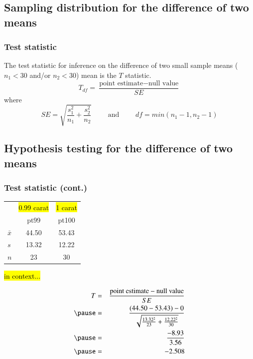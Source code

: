 
\subsection{Sampling distribution for the difference of two means}


\begin{frame}
\frametitle{Test statistic}

{The test statistic for inference on the difference of two small sample means ($n_1 < 30$ and/or $n_2 < 30$) mean is the $T$ statistic.
\[ T_{df} = \frac{\text{point estimate} - \text{null value}}{SE} \]
where 
\[ SE = \sqrt{ \frac{s_1^2}{n_1} + \frac{s_2^2}{n_2} } \qquad \text{ and } \qquad df = min(n_1 - 1, n_2 - 1) \]
}


\end{frame}


\subsection{Hypothesis testing for the difference of two means}


\begin{frame}
\frametitle{Test statistic (cont.)}

{\small
\begin{center}
\begin{tabular}{l | c | c}
		& {\footnotesize \hl{0.99 carat}} &  {\footnotesize \hl{1 carat}}  \\
		& pt99	& pt100 \\
\hline
$\bar{x}$	& 44.50		& 53.43 \\
$s$		& 13.32		& 12.22 \\
$n$		& 23			& 30
\end{tabular}
\end{center}
}

\hl{in context...}

\pause

{\small
\begin{eqnarray*}
T &=& \frac{\text{point estimate} - \text{null value} }{SE} \\
\pause
&=& \frac{(44.50 - 53.43) - 0}{ \sqrt{\frac{13.32^2}{23} + \frac{12.22^2}{30} }} \\
\pause
&=& \frac{-8.93}{3.56} \\
\pause
&=& -2.508
\end{eqnarray*}
}

\end{frame}

